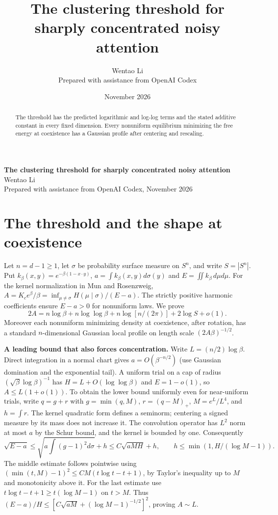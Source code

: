 \documentclass[10pt]{article}
\title{The clustering threshold for sharply concentrated noisy attention}
\author{Wentao Li\\{\small Prepared with assistance from OpenAI Codex}}
\date{November 2026}
\begin{document}
\begin{center}{\Large\bfseries The clustering threshold for sharply concentrated noisy attention}\\[3pt]Wentao Li\\{\small Prepared with assistance from OpenAI Codex, November 2026}\end{center}
\begin{abstract}
The threshold has the predicted logarithmic and log-log terms and the stated additive constant in every fixed dimension. Every nonuniform equilibrium minimizing the free energy at coexistence has a Gaussian profile after centering and rescaling.
\end{abstract}
\section*{The threshold and the shape at coexistence}
Let $n=d-1\ge1$, let $\sigma$ be probability surface measure on $S^n$, and write $S=|S^n|$. Put $k_\beta(x,y)=e^{-\beta(1-x\cdot y)}$, $a=\int k_\beta(x,y)d\sigma(y)$ and $E=\iint k_\beta\,d\mu d\mu$. For the kernel normalization in Mun and Rosenzweig, $A=K_c e^\beta/\beta=\inf_{\mu\ne\sigma}H(\mu\mid\sigma)/(E-a)$. The strictly positive harmonic coefficients ensure $E-a>0$ for nonuniform laws. We prove
\[
 2A=n\log\beta+n\log\log\beta+
             n\log[n/(2\pi)]+2\log S+o(1).
\]
Moreover each nonuniform minimizing density at coexistence, after rotation, has a standard $n$-dimensional Gaussian local profile on length scale $(2A\beta)^{-1/2}$.

\textbf{A leading bound that also forces concentration.} Write $L=(n/2)\log\beta$. Direct integration in a normal chart gives $a=O(\beta^{-n/2})$ (use Gaussian domination and the exponential tail). A uniform trial on a cap of radius $(\sqrt{\beta}\log\beta)^{-1}$ has $H=L+O(\log\log\beta)$ and $E=1-o(1)$, so $A\le L(1+o(1))$. To obtain the lower bound uniformly even for near-uniform trials, write $q=g+r$ with $g=\min(q,M)$, $r=(q-M)_+$, $M=e^L/L^4$, and $h=\int r$. The kernel quadratic form defines a seminorm; centering a signed measure by its mass does not increase it. The convolution operator has $L^2$ norm at most $a$ by the Schur bound, and the kernel is bounded by one. Consequently
\[
 \sqrt{E-a}\le \sqrt{a\int (g-1)^2 d\sigma}+h
       \le C\sqrt{a M H}+h,\qquad
 h\le\min(1,H/(\log M-1)).
\]
The middle estimate follows pointwise using $(\min(t,M)-1)^2\le C M(t\log t-t+1)$, by Taylor's inequality up to $M$ and monotonicity above it. For the last estimate use $t\log t-t+1\ge t(\log M-1)$ on $t>M$. Thus $(E-a)/H\le[C\sqrt{aM}+(\log M-1)^{-1/2}]^2$, proving $A\sim L$.
\end{document}
